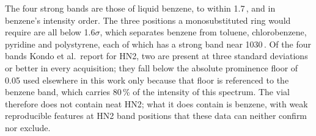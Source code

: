 \begin{table}[htbp]
\begin{flushleft}\footnotesize The four strong bands are those of liquid benzene, to
within 1.7\,\wn{}, and in benzene's
intensity order. The three positions a monosubstituted ring would require are all below
1.6$\sigma$, which separates benzene
from toluene, chlorobenzene, pyridine and polystyrene, each of which has a strong band near
1030\,\wn{}. Of the four bands Kondo et al.\ report for HN2, two are present at three
standard deviations or better in every acquisition; they fall below the absolute prominence
floor of 0.05 used elsewhere in this work only because that floor is referenced to the
benzene band, which carries 80\,\% of the intensity of this spectrum. The vial therefore
does not contain neat HN2; what it does contain is benzene, with weak reproducible features
at HN2 band positions that these data can neither confirm nor
exclude.\end{flushleft}
\end{table}
